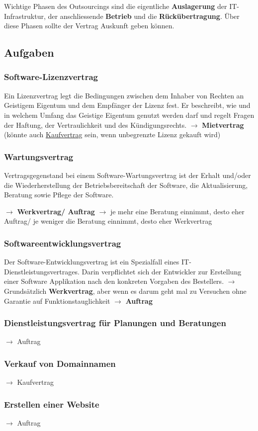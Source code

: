 Wichtige Phasen des Outsourcings sind die eigentliche \textbf{Auslagerung} der IT-Infrastruktur, der anschliessende \textbf{Betrieb} und die \textbf{Rückübertragung}. Über diese Phasen sollte der Vertrag
Auskunft geben können.

\subsection{Aufgaben}

\subsubsection{Software-Lizenzvertrag}
Ein Lizenzvertrag legt die Bedingungen zwischen dem Inhaber von Rechten an Geistigem Eigentum und dem Empfänger der Lizenz fest. Er beschreibt, wie und in welchem Umfang das Geistige Eigentum genutzt werden darf und regelt Fragen der Haftung, der Vertraulichkeit und des
Kündigungsrechts.
$\rightarrow$ \textbf{Mietvertrag} (könnte auch \underline{Kaufvertrag} sein, wenn unbegrenzte Lizenz gekauft wird)

\subsubsection{Wartungsvertrag}
Vertragsgegenstand bei einem Software-Wartungsvertrag ist der Erhalt und/oder die Wiederherstellung der Betriebsbereitschaft der Software, die Aktualisierung, Beratung sowie Pflege der Software.

$\rightarrow$ \textbf{Werkvertrag/ Auftrag} $\rightarrow$ je mehr eine Beratung einnimmt, desto eher Auftrag/ je weniger die Beratung einnimmt, desto eher Werkvertrag

\subsubsection{Softwareentwicklungsvertrag}
Der Software-Entwicklungsvertrag ist ein Spezialfall eines IT-Dienstleistungsvertrages. Darin verpflichtet sich der Entwickler zur Erstellung einer Software Applikation nach den konkreten Vorgaben des Bestellers.
$\rightarrow$ Grundsätzlich \textbf{Werkvertrag}, aber wenn es darum geht mal zu Versuchen ohne Garantie auf Funktionstauglichkeit $\rightarrow$ \textbf{Auftrag}

\subsubsection{Dienstleistungsvertrag für Planungen und Beratungen}
$\rightarrow$ Auftrag

\subsubsection{Verkauf von Domainnamen}
$\rightarrow$ Kaufvertrag

\subsubsection{Erstellen einer Website}
$\rightarrow$ Auftrag